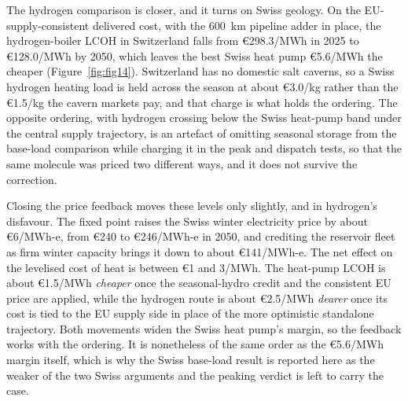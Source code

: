 The hydrogen comparison is closer, and it turns on Swiss geology. On the
EU-supply-consistent delivered cost, with the 600~km pipeline adder in place, the
hydrogen-boiler LCOH in Switzerland falls from \euro{}298.3/MWh in 2025 to
\euro{}128.0/MWh by 2050, which leaves the best Swiss heat pump \euro{}5.6/MWh the
cheaper (Figure~\ref{fig:fig14}). Switzerland has no domestic salt caverns, so a
Swiss hydrogen heating load is held across the season at about \euro{}3.0/kg rather
than the \euro{}1.5/kg the cavern markets pay, and that charge is what holds the
ordering. The opposite ordering, with hydrogen crossing below the
Swiss heat-pump band under the central supply trajectory, is an
artefact of omitting seasonal storage from the base-load comparison while charging
it in the peak and dispatch tests, so that the same molecule was priced two
different ways, and it does not survive the correction.

Closing the price feedback moves these levels only slightly, and in hydrogen's
disfavour. The fixed point raises the
Swiss winter electricity price by about \euro{}6/MWh-e, from \euro{}240 to
\euro{}246/MWh-e in 2050, and crediting the reservoir fleet as firm winter capacity
brings it down to about \euro{}141/MWh-e. The net effect on the levelised cost of
heat is between \euro{}1 and 3/MWh. The heat-pump LCOH is about \euro{}1.5/MWh
\emph{cheaper} once the seasonal-hydro credit and the consistent EU price are
applied, while the hydrogen route is about \euro{}2.5/MWh \emph{dearer} once its
cost is tied to the EU supply side in place of the more optimistic standalone
trajectory. Both movements widen the Swiss heat pump's margin, so the feedback works with the ordering. It is nonetheless of the same order
as the \euro{}5.6/MWh margin itself, which is why the Swiss base-load result is
reported here as the weaker of the two Swiss arguments and the peaking verdict is
left to carry the case.

